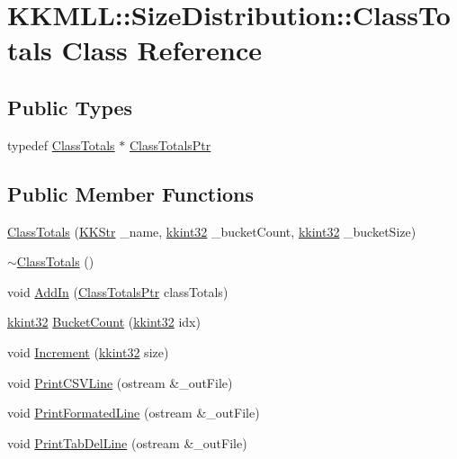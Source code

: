 \hypertarget{class_size_distribution_1_1_class_totals}{}\section{K\+K\+M\+LL\+:\+:Size\+Distribution\+:\+:Class\+Totals Class Reference}
\label{class_size_distribution_1_1_class_totals}
\subsection*{Public Types}
\begin{DoxyCompactItemize}
\item 
typedef \hyperlink{class_size_distribution_1_1_class_totals}{Class\+Totals} $\ast$ \hyperlink{class_size_distribution_1_1_class_totals_a2686de1099514e243ffe29eef7c0ed03}{Class\+Totals\+Ptr}
\end{DoxyCompactItemize}
\subsection*{Public Member Functions}
\begin{DoxyCompactItemize}
\item 
\hyperlink{class_size_distribution_1_1_class_totals_abacdf91147fa58ad254f3fa8d47bef90}{Class\+Totals} (\hyperlink{class_k_k_b_1_1_k_k_str}{K\+K\+Str} \+\_\+name, \hyperlink{namespace_k_k_b_a8fa4952cc84fda1de4bec1fbdd8d5b1b}{kkint32} \+\_\+bucket\+Count, \hyperlink{namespace_k_k_b_a8fa4952cc84fda1de4bec1fbdd8d5b1b}{kkint32} \+\_\+bucket\+Size)
\item 
\hyperlink{class_size_distribution_1_1_class_totals_a9905046ee3b38f8fdaa39c939a3c4e43}{$\sim$\+Class\+Totals} ()
\item 
void \hyperlink{class_size_distribution_1_1_class_totals_afde0af98f52a32c9f4e4a1c565fcd578}{Add\+In} (\hyperlink{class_size_distribution_1_1_class_totals_a2686de1099514e243ffe29eef7c0ed03}{Class\+Totals\+Ptr} class\+Totals)
\item 
\hyperlink{namespace_k_k_b_a8fa4952cc84fda1de4bec1fbdd8d5b1b}{kkint32} \hyperlink{class_size_distribution_1_1_class_totals_a7f2650dd7bf999bb3bd7d6d47be44205}{Bucket\+Count} (\hyperlink{namespace_k_k_b_a8fa4952cc84fda1de4bec1fbdd8d5b1b}{kkint32} idx)
\item 
void \hyperlink{class_size_distribution_1_1_class_totals_a4ae3124b677375b4463b7999bf0be3ce}{Increment} (\hyperlink{namespace_k_k_b_a8fa4952cc84fda1de4bec1fbdd8d5b1b}{kkint32} size)
\item 
void \hyperlink{class_size_distribution_1_1_class_totals_aae85f6f814c4cf8f7ebb4596db33489c}{Print\+C\+S\+V\+Line} (ostream \&\+\_\+out\+File)
\item 
void \hyperlink{class_size_distribution_1_1_class_totals_a5b972efef1b0f250db0efcc406def40a}{Print\+Formated\+Line} (ostream \&\+\_\+out\+File)
\item 
void \hyperlink{class_size_distribution_1_1_class_totals_a86f9de58eb0595523ed77ae3e75bf28b}{Print\+Tab\+Del\+Line} (ostream \&\+\_\+out\+File)
\end{DoxyCompactItemize}
